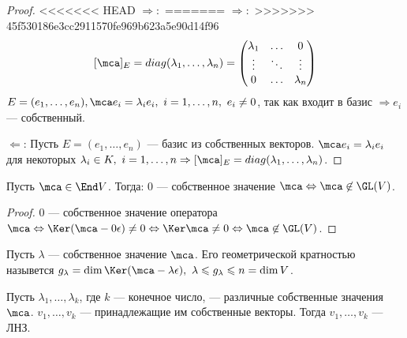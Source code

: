 \documentclass[main]{subfiles}
\begin{document}
\begin{proof}
<<<<<<< HEAD
    $\Rightarrow:$
=======
   $\Rightarrow:$
>>>>>>> 45f530186e3cc2911570fe969b623a5e90d14f96
    \[ [\mca]_E = diag(\lambda_1, \ldots, \lambda_n) = \begin{pmatrix}
            \lambda_1 & \ldots & 0         \\
            \vdots    & \ddots & \vdots    \\
            0         & \ldots & \lambda_n \\
        \end{pmatrix}\]
    $ E = (e_1, \ldots, e_n), \mca e_i = \lambda_i e_i,\ i = 1, \ldots, n,\ e_i \neq 0 $,
    так как входит в базис $\Rightarrow e_i$ — собственный.

    $\Leftarrow$: Пусть  $E = (e_1, \ldots, e_n)$ — базис из собственных векторов.
     $\mca e_i = \lambda_i e_i$ для некоторых $\lambda_i \in K, \ i = 1, \ldots, n 
    \Rightarrow [\mca]_E
     = diag(\lambda_1, \ldots, \lambda_n)$.
\end{proof}

\begin{lemma}
    Пусть $\mca \in \End V$. Тогда: 0 — собственное значение $\mca  
    \Leftrightarrow \mca \not\in \GL(V)$.
\end{lemma}

\begin{proof}
    0 — собственное значение оператора $\mca \Leftrightarrow
    \Ker (\mca - 0\epsilon) \neq 0 \Leftrightarrow
    \Ker \mca \neq 0 \Leftrightarrow \mca \not\in \GL(V)$.
\end{proof}

\begin{definition}
    Пусть $\lambda$ — собственное значение $\mca$. 
    Его геометрической кратностью назывется 
    $g_\lambda = \dim \Ker (\mca -\lambda\epsilon),\ \lambda \leqslant g_\lambda \leqslant n = \dim V$.
\end{definition}

\begin{proposition}
    Пусть $\lambda_1, \ldots, \lambda_k$, где $k$ — конечное число, — различные собственные значения $\mca$.
    $v_1, \ldots, v_k$ — принадлежащие им собственные векторы.
    Тогда  $v_1, \ldots, v_k$ — ЛНЗ.
\end{proposition}
\end{document}
